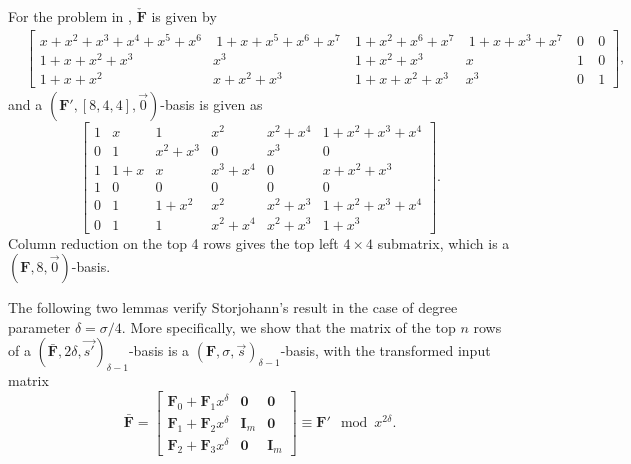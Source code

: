 \begin{exmp}
\label{exm:auxiliaryTransformation}For the problem in ,
$\check{\mathbf{F}}$ is given by \begin{align*}
 & \left[{\begin{array}{cccccr}
x+x^{2}+x^{3}+x^{4}+x^{5}+x^{6} & \ 1+x+x^{5}+x^{6}+x^{7}\  & 1+x^{2}+x^{6}+x^{7} & \ 1+x+x^{3}+x^{7}\  & 0\  & 0\\
1+x+x^{2}+x^{3} & x^{3} & 1+x^{2}+x^{3} & x & 1\  & 0\\
1+x+x^{2} & x+x^{2}+x^{3} & 1+x+x^{2}+x^{3} & x^{3} & 0\  & 1\end{array}}\right],\end{align*}
 and a $\left(\mathbf{F}',\left[8,4,4\right],\vec{0}\right)$-basis
is given as \[
\left[\begin{array}{rccc|cc}
1 & x & 1 & x^{2} & x^{2}+x^{4} & 1+x^{2}+x^{3}+x^{4}\\
0 & 1 & x^{2}+x^{3} & 0 & x^{3} & 0\\
1 & 1+x & x & x^{3}+x^{4} & 0 & x+x^{2}+x^{3}\\
1 & 0 & 0 & 0 & 0 & 0\\
\hline 0 & 1 & 1+x^{2} & x^{2} & x^{2}+x^{3} & 1+x^{2}+x^{3}+x^{4}\\
0 & 1 & 1 & x^{2}+x^{4} & x^{2}+x^{3} & 1+x^{3}\end{array}\right].\]
 Column reduction on the top 4 rows gives the top left $4\times4$
submatrix, which is a \textbf{$(\mathbf{F},8,\vec{0})$}-basis. 
\end{exmp}
The following two lemmas verify Storjohann's result in the case of
degree parameter $\delta=\sigma/4$. More specifically, we show that
the matrix of the top $n$ rows of a $(\bar{\mathbf{F}},2\delta,\vec{s'})_{\delta-1}$-basis
is a $\left(\mathbf{F},\sigma,\vec{s}\right)_{\delta-1}$-basis, with
the transformed input matrix \begin{equation}
\bar{\mathbf{F}}=\left[\begin{array}{l|cr}
\mathbf{F}_{0}+\mathbf{F}_{1}x^{\delta} & \mathbf{0} & \mathbf{0}\\
\hline \mathbf{F}_{1}+\mathbf{F}_{2}x^{\delta} & \mathbf{I}_{m} & \mathbf{0}\\
\mathbf{F}_{2}+\mathbf{F}_{3}x^{\delta} & \mathbf{0} & \mathbf{I}_{m}\end{array}\right]\equiv\mathbf{F}'\mod x^{2\delta}.\label{eq:storjohannTransformation4parts}\end{equation}

